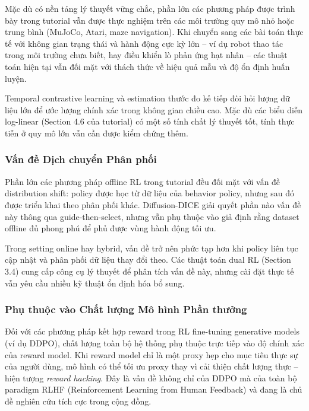 Mặc dù có nền tảng lý thuyết vững chắc, phần lớn các phương pháp được trình bày trong tutorial
vẫn được thực nghiệm trên các môi trường quy mô nhỏ hoặc trung bình (MuJoCo, Atari, maze navigation).
Khi chuyển sang các bài toán thực tế với không gian trạng thái và hành động cực kỳ lớn --
ví dụ robot thao tác trong môi trường chưa biết, hay điều khiển lò phản ứng hạt nhân --
các thuật toán hiện tại vẫn đối mặt với thách thức về hiệu quả mẫu và độ ổn định huấn luyện.

Temporal contrastive learning và estimation thước đo kế tiếp đòi hỏi lượng dữ liệu lớn để ước lượng
chính xác trong không gian chiều cao.
Mặc dù các biểu diễn log-linear (Section 4.6 của tutorial) có một số tính chất lý thuyết tốt,
tính thực tiễn ở quy mô lớn vẫn cần được kiểm chứng thêm.

\subsubsection{Vấn đề Dịch chuyển Phân phối}

Phần lớn các phương pháp offline RL trong tutorial đều đối mặt với vấn đề distribution shift:
policy được học từ dữ liệu của behavior policy, nhưng sau đó được triển khai theo phân phối khác.
Diffusion-DICE giải quyết phần nào vấn đề này thông qua guide-then-select, nhưng vẫn phụ thuộc vào
giả định rằng dataset offline đủ phong phú để phủ được vùng hành động tối ưu.

Trong setting online hay hybrid, vấn đề trở nên phức tạp hơn khi policy liên tục cập nhật và
phân phối dữ liệu thay đổi theo.
Các thuật toán dual RL (Section 3.4) cung cấp công cụ lý thuyết để phân tích vấn đề này,
nhưng cài đặt thực tế vẫn yêu cầu nhiều kỹ thuật ổn định hóa bổ sung.

\subsubsection{Phụ thuộc vào Chất lượng Mô hình Phần thưởng}

Đối với các phương pháp kết hợp reward trong RL fine-tuning generative models (ví dụ DDPO),
chất lượng toàn bộ hệ thống phụ thuộc trực tiếp vào độ chính xác của reward model.
Khi reward model chỉ là một proxy hẹp cho mục tiêu thực sự của người dùng,
mô hình có thể tối ưu proxy thay vì cải thiện chất lượng thực -- hiện tượng \textit{reward hacking}.
Đây là vấn đề không chỉ của DDPO mà của toàn bộ paradigm RLHF (Reinforcement Learning from Human Feedback)
và đang là chủ đề nghiên cứu tích cực trong cộng đồng.


